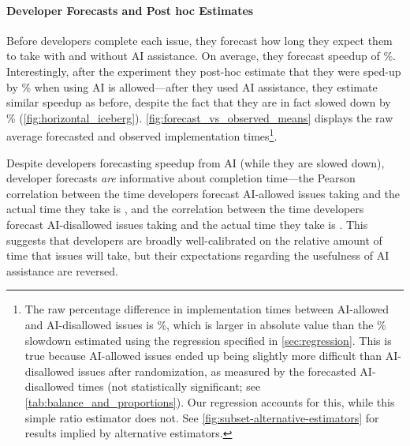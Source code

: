 \documentclass{article}
\begin{document}
\paragraph*{Developer Forecasts and Post hoc Estimates}
Before developers complete each issue, they forecast how long they expect them to take with and without AI assistance. On average, they forecast speedup of \PctSpeedupForecastAbsValue \%. Interestingly, after the experiment they post-hoc estimate that they were sped-up by \PctSpeedupBackcastAbsValue \% when using AI is allowed---after they used AI assistance, they estimate similar speedup as before, despite the fact that they are in fact slowed down by \PctSpeedupBaselineAbsValue\% (\autoref{fig:horizontal_iceberg}).
\autoref{fig:forecast_vs_observed_means} displays the raw average forecasted and observed implementation times\footnote{The raw percentage difference in implementation times between AI-allowed and AI-disallowed issues is \PctSpeedupRatioEstimator\%, which is larger in absolute value than the \PctSpeedupBaselineAbsValue\% slowdown estimated using the regression specified in \autoref{sec:regression}. This is true because AI-allowed issues ended up being slightly more difficult than AI-disallowed issues after randomization, as measured by the forecasted AI-disallowed times (not statistically significant; see \autoref{tab:balance_and_proportions}). Our regression accounts for this, while this simple ratio estimator does not. See \autoref{fig:subset-alternative-estimators} for results implied by alternative estimators.}.

Despite developers forecasting speedup from AI (while they are slowed down), developer forecasts \emph{are} informative about completion time---the Pearson correlation between the time developers forecast AI-allowed issues taking and the actual time they take is \CorrForecastAndImplementationTimeAIAllowed, and the correlation between the time developers forecast AI-disallowed issues taking and the actual time they take is \CorrForecastAndImplementationTimeNoAI. This suggests that developers are broadly well-calibrated on the relative amount of time that issues will take, but their expectations regarding the usefulness of AI assistance are reversed.
\end{document}
